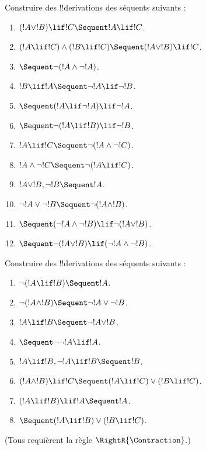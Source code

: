 \documentclass[11pt,a4paper,openany]{memoir}
\begin{document}
\begin{prob}
Construire des !!{derivation}s des séquents suivants :
\begin{enumerate}
\item $(!A \lor !B) \lif !C \Sequent !A \lif !C$.
\item $(!A \lif !C) \land (!B \lif !C) \Sequent (!A \lor !B) \lif !C$.
\item $\Sequent \lnot(!A \land \lnot !A)$.
\item $!B \lif !A \Sequent \lnot !A \lif \lnot !B$.
\item $\Sequent (!A \lif \lnot !A) \lif \lnot !A$.
\item $\Sequent \lnot(!A \lif !B) \lif \lnot !B$.
\item $!A \lif !C \Sequent \lnot (!A \land \lnot !C)$.
\item $!A \land \lnot !C \Sequent \lnot (!A \lif !C)$.
\item $!A \lor !B, \lnot !B \Sequent !A$.
\item $\lnot !A \lor \lnot !B \Sequent \lnot(!A \land !B)$.
\item $\Sequent (\lnot !A \land \lnot !B) \lif\lnot(!A \lor !B)$.
\item $\Sequent \lnot(!A \lor !B) \lif (\lnot !A \land \lnot !B)$.
\end{enumerate}
\end{prob}

\begin{prob}
Construire des !!{derivation}s des séquents suivants :
\begin{enumerate}
\item $\lnot(!A \lif !B) \Sequent !A$.
\item $\lnot(!A \land !B) \Sequent \lnot !A \lor \lnot !B$.
\item $!A \lif !B \Sequent \lnot !A \lor !B$.
\item $\Sequent \lnot \lnot !A \lif !A$.
\item $!A \lif !B, \lnot !A \lif !B \Sequent !B$.
\item $(!A \land !B) \lif !C \Sequent (!A \lif !C) \lor (!B \lif !C)$.
\item $(!A \lif !B) \lif !A \Sequent !A$.
\item $\Sequent (!A \lif !B) \lor (!B \lif !C)$.
\end{enumerate}
(Tous requièrent la règle $\RightR{\Contraction}$.)
\end{prob}

\endgroup
\end{document}
